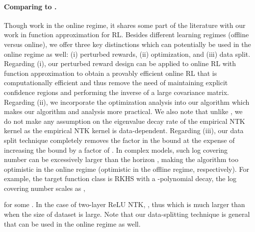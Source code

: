 \documentclass{article} \usepackage{iclr2023/iclr2023_conference,times}
\begin{document}
\paragraph{Comparing to \cite{yang2020function}.} Though \citet{yang2020function} work in the online regime, it shares some part of the literature with our work in function approximation for RL. Besides different learning regimes (offline versus online), we offer three key distinctions which can potentially be used in the online regime as well: (i) perturbed rewards, (ii) optimization, and (iii) data split. Regarding (i), our perturbed reward design can be applied to online RL with function approximation to obtain a provably efficient online RL that is computationally efficient and thus remove the need of maintaining explicit confidence regions and performing the inverse of a large covariance matrix. Regarding (ii), we incorporate the optimization analysis into our algorithm which makes our algorithm and analysis more practical. We also note that unlike \citep{yang2020function}, we do not make any assumption on the eigenvalue decay rate of the empirical NTK kernel as the empirical NTK kernel is data-dependent. Regarding (iii), our data split technique completely removes the factor  in the bound at the expense of increasing the bound by a factor of . In complex models, such log covering number can be excessively larger than the horizon , making the algorithm too optimistic in the online regime (optimistic in the offline regime, respectively). For example, the target function class is RKHS with a -polynomial decay, the log covering number scales as \citep[Lemma~D1]{yang2020function},

for some . In the case of two-layer ReLU NTK,  \citep{bietti2019inductive}, thus  which is much larger than  when the size of dataset is large. Note that our data-splitting technique is general that can be used in the online regime as well. 
\end{document}
